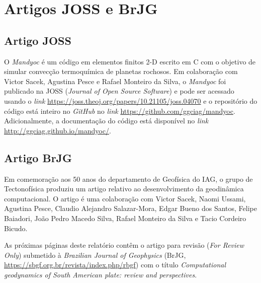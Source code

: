 \chapter{Artigos JOSS e BrJG}
\label{artigos}

\section{Artigo JOSS}

O \textit{Mandyoc} é um código em elementos finitos 2-D escrito em C com o objetivo de simular convecção termoquímica de planetas rochosos. Em colaboração com Victor Sacek, Agustina Pesce e Rafael Monteiro da Silva, o \textit{Mandyoc} foi publicado na JOSS (\textit{Journal of Open Source Software}) e pode ser acessado usando o \textit{link} \url{https://joss.theoj.org/papers/10.21105/joss.04070} e o repositório do código está inteiro no \textit{GitHub} no \textit{link} \url{https://github.com/ggciag/mandyoc}. Adicionalmente, a documentação do código está disponível no \textit{link} \url{http://ggciag.github.io/mandyoc/}.

\section{Artigo BrJG}

Em comemoração aos 50 anos do departamento de Geofísica do IAG, o grupo de Tectonofísica produziu um artigo relativo ao desenvolvimento da geodinâmica computacional. O artigo é uma colaboração com Victor Sacek, Naomi Ussami, Agustina Pesce, Claudio Alejandro Salazar-Mora, Edgar Bueno dos Santos, Felipe Baiadori, João Pedro Macedo Silva, Rafael Monteiro da Silva e Tacio Cordeiro Bicudo.

As próximas páginas deste relatório contêm o artigo para revisão (\textit{For Review Only}) submetido à \textit{Brazilian Journal of Geophysics} (BrJG, \url{https://sbgf.org.br/revista/index.php/rbgf}) com o título \textit{Computational geodynamics of South American plate: review and perspectives}.




